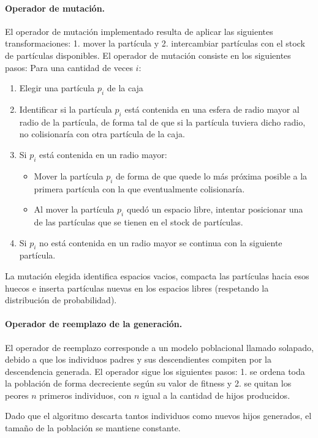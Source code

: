 \documentclass[a4paper,11pt]{book}
\begin{document}
\paragraph{Operador de mutación.}
El operador de mutación implementado resulta de aplicar las siguientes transformaciones: 1. mover la partícula y 2. intercambiar partículas con el stock de partículas disponibles.
El operador de mutación consiste en los siguientes pasos:
Para una cantidad de veces $i$:
\begin{enumerate}
	\item Elegir una partícula $p_i$ de la caja
	\item Identificar si la partícula $p_i$ está contenida en una esfera de radio mayor al radio de la partícula, de forma tal de que si la partícula tuviera dicho radio, no colisionaría con otra partícula de la caja.
	\item Si $p_i$ está contenida en un radio mayor:
	      \begin{itemize}
		      \item Mover la partícula $p_i$ de forma de que quede lo más próxima posible a la primera partícula con la que eventualmente colisionaría.
		      \item Al mover la partícula $p_i$ quedó un espacio libre, intentar posicionar una de las partículas que se tienen en el stock de partículas.
	      \end{itemize}
	\item Si $p_i$ no está contenida en un radio mayor se continua con la siguiente partícula.
\end{enumerate}

La mutación elegida identifica espacios vacios, compacta las partículas hacia esos huecos e inserta partículas nuevas en los espacios libres (respetando la distribución de probabilidad).

\paragraph{Operador de reemplazo de la generación.}
El operador de reemplazo corresponde a un modelo poblacional llamado solapado, debido a que los individuos padres y sus descendientes compiten por la descendencia generada. El operador sigue los siguientes pasos: 1. se ordena toda la población de forma decreciente según su valor de fitness y 2. se quitan los peores $n$ primeros individuos, con $n$ igual a la cantidad de hijos producidos.

Dado que el algoritmo descarta tantos individuos como nuevos hijos generados, el tamaño de la población se mantiene constante. %
\end{document}
